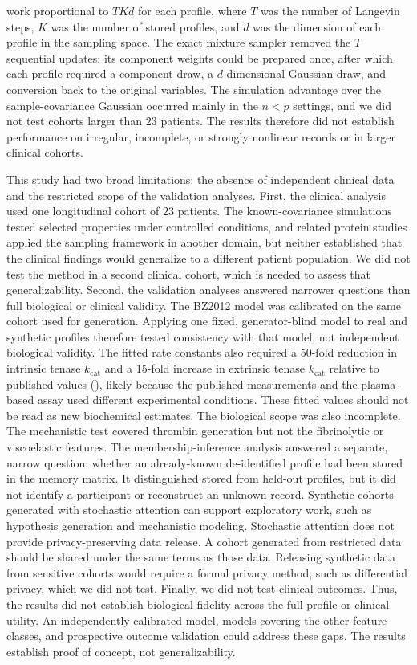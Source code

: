 work proportional to $TKd$ for each profile, where $T$ was the number of Langevin steps,
$K$ was the number of stored profiles, and $d$ was the dimension of each profile in the
sampling space. The exact mixture sampler removed the $T$ sequential updates: its component
weights could be prepared once, after which each profile
required a component draw, a $d$-dimensional Gaussian draw, and conversion back to the
original variables. The simulation advantage over the sample-covariance Gaussian occurred
mainly in the $n<p$ settings, and we did not test cohorts larger than $23$ patients.
The results therefore did not establish performance on irregular, incomplete, or
strongly nonlinear records or in larger clinical cohorts.

This study had two broad limitations: the absence of independent clinical data and the
restricted scope of the validation analyses. First, the clinical analysis used one
longitudinal cohort of $23$ patients. The known-covariance simulations tested selected
properties under controlled conditions, and related protein studies applied the sampling
framework in another domain, but neither established that the clinical findings would
generalize to a different patient population. We did not test the method in a second clinical
cohort, which is needed to assess that generalizability. Second, the validation analyses
answered narrower questions than full biological or clinical validity. The BZ2012
model was calibrated on the same cohort used for generation. Applying one fixed,
generator-blind model to real and synthetic profiles therefore tested consistency with that
model, not independent biological validity.
The fitted rate constants also required a 50-fold reduction in intrinsic tenase
$k_{\text{cat}}$ and a 15-fold
increase in extrinsic tenase $k_{\text{cat}}$ relative to published values
(), likely because the published measurements and the
plasma-based assay used different experimental conditions. These fitted values should not be
read as new biochemical estimates. The biological scope was also incomplete. The
mechanistic test covered thrombin generation but not the fibrinolytic or viscoelastic
features. The membership-inference analysis answered a separate, narrow question: whether an
already-known de-identified profile had been stored in the memory matrix. It distinguished
stored from held-out profiles, but it did not identify a participant or reconstruct an
unknown record.
Synthetic cohorts generated with stochastic attention can support exploratory work,
such as hypothesis generation and mechanistic modeling. Stochastic attention does not provide
privacy-preserving data release. A cohort generated from restricted data should be shared
under the same terms as those data. Releasing synthetic data from sensitive cohorts
would require a formal privacy method, such as differential privacy, which
we did not test. Finally, we did not test clinical outcomes. Thus, the results
did not establish biological fidelity across the full profile or clinical utility. An
independently calibrated model, models covering the other feature classes, and prospective
outcome validation could address these gaps. The results establish proof of concept, not
generalizability.
